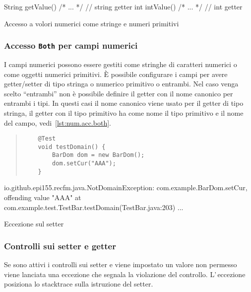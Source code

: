\documentclass[a4paper,10pt]{report}
\newenvironment{elisting}[1][H]
  {\captionsetup{aboveskip=0pt}\begin{listing}[#1]}
  {\end{listing}%
}
\begin{document}
\begin{elisting}[!htb]
\begin{javacode}
    String getValue() { /* ... */ }   // string getter
    int intValue() { /* ... */ }      // int getter
\end{javacode}
\caption{Accesso a volori numerici come stringe e numeri primitivi}
\label{lst:num.acc.both}
\end{elisting}

\subsubsection*{Accesso \texttt{Both} per campi numerici}
I campi numerici possono essere gestiti come stringhe di caratteri numerici o
come oggetti numerici primitivi. È possibile configurare i campi per avere 
getter/setter di tipo stringa o numerico primitivo o entrambi.
Nel caso venga scelto ``entrambi'' non è possibile definire il getter con il
nome canonico per entrambi i tipi.
In questi casi il nome canonico viene usato per il getter di tipo stringa,
il getter con il tipo primitivo ha come nome il tipo primitivo e il nome del 
campo, vedi~\ref{lst:num.acc.both}.

\begin{elisting}[!htb]
\begin{quote}
\begin{verbatim}
    @Test
    void testDomain() {
        BarDom dom = new BarDom();
        dom.setCur("AAA");
    }
\end{verbatim}
\end{quote}
\vspace*{-1cm}
\begin{javacode}
io.github.epi155.recfm.java.NotDomainException: com.example.BarDom.setCur, offending value "AAA"
	at com.example.test.TestBar.testDomain(TestBar.java:203)
	...
\end{javacode}
\caption{Eccezione sul setter}
\label{lst:set.throw}
\end{elisting}

\subsubsection*{Controlli sui setter e getter}
Se sono attivi i controlli sui setter e viene impostato un valore non permesso 
viene lanciata una eccezione che segnala la violazione del controllo.
L'\,eccezione posiziona lo stacktrace sulla istruzione del setter.
\end{document}
